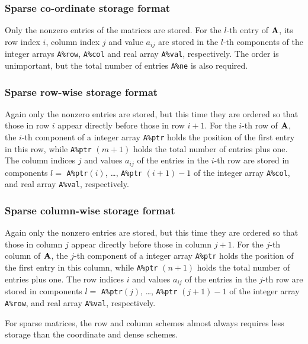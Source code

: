 \documentclass{galahad}
\begin{document}
\subsubsection{Sparse co-ordinate storage format}\label{coordinate}
Only the nonzero entries of the matrices are stored. For the 
$l$-th entry of ${\mathbf{A}}$, its row index $i$, column index $j$ 
and value $a_{ij}$
are stored in the $l$-th components of the integer arrays {\tt A\%row}, 
{\tt A\%col} and real array {\tt A\%val}, respectively.
The order is unimportant, but the total
number of entries {\tt A\%ne} is also required. 

\subsubsection{Sparse row-wise storage format}\label{rowwise}
Again only the nonzero entries are stored, but this time
they are ordered so that those in row $i$ appear directly before those
in row $i+1$. For the $i$-th row of ${\mathbf{A}}$, the $i$-th component of a 
integer array {\tt A\%ptr} holds the position of the first entry in this row,
while {\tt A\%ptr} $(m+1)$ holds the total number of entries plus one.
The column indices $j$ and values $a_{ij}$ of the entries in the $i$-th row 
are stored in components 
$l =$ {\tt A\%ptr}$(i)$, \ldots , {\tt A\%ptr} $(i+1)-1$ of the 
integer array {\tt A\%col}, and real array {\tt A\%val}, respectively. 

\subsubsection{Sparse column-wise storage format}\label{colwise}
Again only the nonzero entries are stored, but this time
they are ordered so that those in column $j$ appear directly before those
in column $j+1$. For the $j$-th column of ${\mathbf{A}}$, the $j$-th component of a 
integer array {\tt A\%ptr} holds the position of the first entry in this column,
while {\tt A\%ptr} $(n+1)$ holds the total number of entries plus one.
The row indices $i$ and values $a_{ij}$ of the entries in the $j$-th row 
are stored in components 
$l =$ {\tt A\%ptr}$(j)$, \ldots , {\tt A\%ptr} $(j+1)-1$ of the 
integer array {\tt A\%row}, and real array {\tt A\%val}, respectively. 

For sparse matrices, the row and column schemes almost always requires 
less storage than the coordinate and dense schemes.

\end{document}
